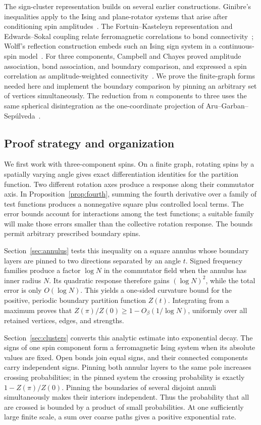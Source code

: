 \documentclass[11pt]{article}
\theoremstyle{definition}
\theoremstyle{remark}
\numberwithin{equation}{section}
\begin{document}
The sign-cluster representation builds on several earlier constructions.
Ginibre's inequalities apply to the Ising and plane-rotator systems
that arise after conditioning spin amplitudes~\cite{Ginibre}.
The Fortuin--Kasteleyn representation and Edwards--Sokal coupling
relate ferromagnetic correlations to bond
connectivity~\cite{FortuinKasteleyn,EdwardsSokal}; Wolff's reflection
construction embeds such an Ising sign system in a continuous-spin
model~\cite{Wolff}. For three components, Campbell and Chayes proved
amplitude association, bond association, and boundary comparison,
and expressed a spin correlation as amplitude-weighted
connectivity~\cite[Lemma~2 and Corollaries~1, 3, and~4]{CC}.
We prove the finite-graph forms needed here and implement the boundary
comparison by pinning an arbitrary set of vertices simultaneously.
The reduction from $n$ components to three uses the same spherical
disintegration as the one-coordinate projection of
Aru--Garban--Sep\'ulveda~\cite[Proposition~2.4]{AGS}.

\subsection{Proof strategy and organization}

We first work with three-component spins. On a finite graph, rotating
spins by a spatially varying angle gives exact differentiation
identities for the partition function. Two different rotation axes
produce a response along their commutator axis. In
Proposition~\ref{prop:fourth}, summing the fourth derivative over a
family of test functions produces a nonnegative square plus controlled
local terms. The error bounds account for interactions among the test
functions; a suitable family will make those errors smaller than the
collective rotation response.
The bounds permit arbitrary prescribed boundary spins.

Section~\ref{sec:annulus} tests this inequality on a square annulus
whose boundary layers are pinned to two directions separated by an
angle $t$. Signed frequency families produce a factor $\log N$ in
the commutator field when the annulus has inner radius $N$.
Its quadratic response therefore gains $(\log N)^2$, while the total
error is only $O(\log N)$. This yields a one-sided curvature bound
for the positive, periodic boundary partition function $Z(t)$.
Integrating from a maximum proves that
$Z(\pi)/Z(0)\ge1-O_\beta(1/\log N)$, uniformly over all retained
vertices, edges, and strengths.

Section~\ref{sec:clusters} converts this analytic estimate into
exponential decay. The signs of one spin component form a
ferromagnetic Ising system when its absolute values are fixed. Open
bonds join equal signs, and their connected components carry
independent signs. Pinning both annular layers to the same pole
increases crossing probabilities; in the pinned system the crossing
probability is exactly $1-Z(\pi)/Z(0)$. Pinning the boundaries of
several disjoint annuli simultaneously makes their interiors
independent. Thus the probability that all are crossed is bounded by
a product of small probabilities. At one sufficiently large finite
scale, a sum over coarse paths gives a positive exponential rate.
\end{document}
